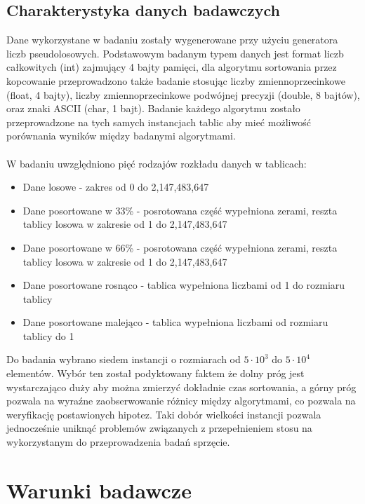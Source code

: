 \documentclass{article}
\begin{document}
    \subsection{Charakterystyka danych badawczych}
      Dane wykorzystane w badaniu zostały wygenerowane przy użyciu generatora liczb pseudolosowych. Podstawowym badanym typem danych jest format liczb całkowitych (int) zajmujący 4 bajty pamięci,
      dla algorytmu sortowania przez kopcowanie przeprowadzono także badanie stosując liczby zmiennoprzecinkowe (float, 4 bajty), liczby zmiennoprzecinkowe podwójnej precyzji (double, 8 bajtów), oraz znaki ASCII (char, 1 bajt).
      Badanie każdego algorytmu zostało przeprowadzone na tych samych instancjach tablic aby mieć możliwość porównania wyników między badanymi algorytmami.
      \\\\W badaniu uwzględniono pięć rodzajów rozkładu danych w tablicach:
      \begin{itemize}
        \item Dane losowe - zakres od 0 do 2,147,483,647
        \item Dane posortowane w 33\% - posrotowana część wypełniona zerami, reszta tablicy losowa w zakresie od 1 do 2,147,483,647
        \item Dane posortowane w 66\% - posrotowana część wypełniona zerami, reszta tablicy losowa w zakresie od 1 do 2,147,483,647
        \item Dane posortowane rosnąco - tablica wypełniona liczbami od 1 do rozmiaru tablicy
        \item Dane posortowane malejąco - tablica wypełniona liczbami od rozmiaru tablicy do 1
      \end{itemize}  
      Do badania wybrano siedem instancji o rozmiarach od $5 \cdot 10^3$ do $5 \cdot 10^4$ elementów. Wybór ten został podyktowany faktem że dolny próg jest wystarczająco duży aby można zmierzyć dokładnie czas sortowania, a górny próg pozwala na wyraźne zaobserwowanie różnicy między algorytmami, co pozwala na weryfikację postawionych hipotez.
      Taki dobór wielkości instancji pozwala jednocześnie uniknąć problemów związanych z przepełnieniem stosu na wykorzystanym do przeprowadzenia badań sprzęcie.
  \section{Warunki badawcze}
\end{document}
